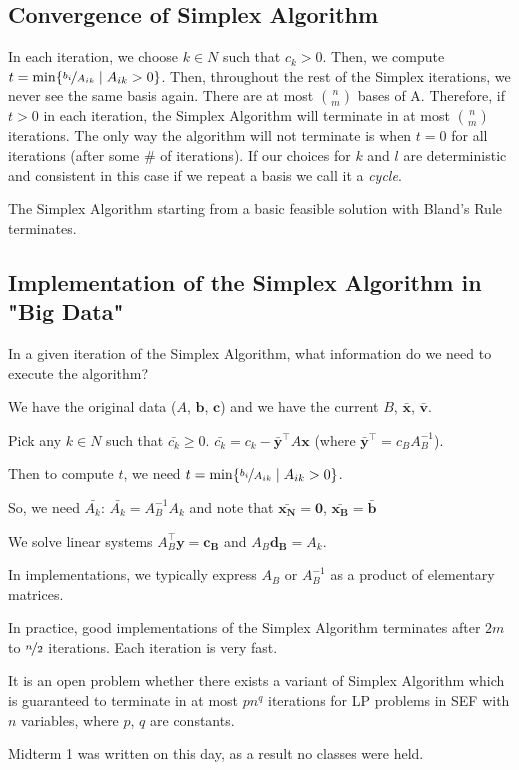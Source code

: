 \subsection{Convergence of Simplex Algorithm}
In each iteration, we choose $k\in N$ such that $c_k>0$. Then, we compute
$t=\min\{\nicefrac{b_i}{A_{ik}}\mid A_{ik}>0\}$. Then, throughout the
rest of the Simplex iterations, we never see the same basis again.
There are at most $\binom{n}{m}$ bases of A. Therefore, if $t>0$ in each iteration,
the Simplex Algorithm will terminate in at most $\binom{n}{m}$ iterations. The only
way the algorithm will not terminate is when $t=0$ for all iterations
(after some \# of iterations). If our choices for $k$ and $l$ are deterministic and
consistent in this case if we repeat a basis we call it a \emph{cycle}.

\begin{thmbox}
    \begin{theorem}
        The Simplex Algorithm starting from a basic feasible solution with
        Bland's Rule terminates.
    \end{theorem}
\end{thmbox}

\subsection{Implementation of the Simplex Algorithm in "Big Data"}
In a given iteration of the Simplex Algorithm, what information do we need to
execute the algorithm?


We have the original data ($A$, $\bm{b}$, $\bm{c}$) and we have the
current $B$, $\bm{\bar{x}}$, $\bm{\bar{v}}$.

Pick any $k\in N$ such that $\bar{c_k}\geqslant  0$. $\bar{c_k}=c_k-\bm{\bar{y}}^\top  A\bm{x}$
(where $\bm{\bar{y}}^\top =c_B A_B^{-1}$).

Then to compute $t$, we need
$t=\min\{\nicefrac{b_i}{A_{ik}}\mid A_{ik}>0\}$.

So, we need
$\bar{A_k}$: $\bar{A_k}=A_B^{-1}A_k$ and note that $\bm{\bar{x_N}}=\bm{0}$,
$\bm{\bar{x_B}}=\bm{\bar{b}}$


We solve linear systems $A_B^\top \bm{y}=\bm{c_B}$ and $A_B\bm{d_B}=A_k$.

In implementations, we typically express $A_B$ or $A_B^{-1}$ as a product of elementary
matrices.

In practice, good implementations of the Simplex Algorithm terminates after $2m$ to
$\nicefrac{n}{2}$ iterations. Each iteration is very fast.

It is an open problem whether there exists a variant of Simplex Algorithm which is
guaranteed to terminate in at most $pn^q$ iterations for LP problems in SEF with $n$
variables, where $p$, $q$ are constants.


Midterm 1 was written on this day, as a result no classes were
held.